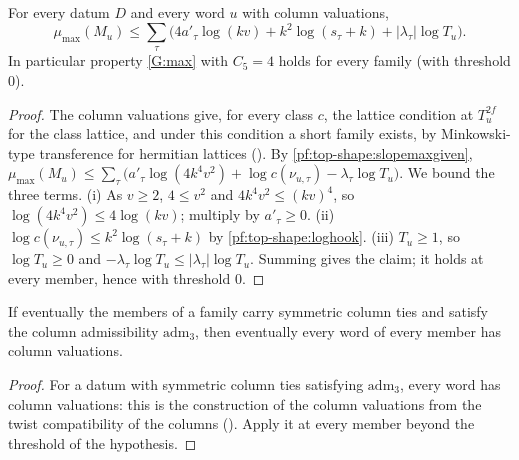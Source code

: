 \begin{theorem}\label{pf:top-shape:upslope}
For every datum $D$ and every word $u$ with column valuations,
\[
\mu_{\max}(M_u)\le\sum_\tau\bigl(4a'_\tau\log(kv)+k^2\log(s_\tau+k)+|\lambda_\tau|\log T_u\bigr).
\]
In particular property \ref{G:max} with $C_5=4$ holds for every family (with threshold $0$).
\end{theorem}

\begin{proof}
The column valuations give, for every class $c$, the lattice condition at $T_u^{2f}$ for the class lattice, and under
this condition a short family exists, by Minkowski-type transference for hermitian lattices
(). By \cref{pf:top-shape:slopemaxgiven},
$\mu_{\max}(M_u)\le\sum_\tau\bigl(a'_\tau\log(4k^4v^2)+\log c(\nu_{u,\tau})-\lambda_\tau\log T_u\bigr)$. We bound the three
terms. (i) As $v\ge2$, $4\le v^2$ and $4k^4v^2\le(kv)^4$, so $\log(4k^4v^2)\le4\log(kv)$; multiply by $a'_\tau\ge0$.
(ii) $\log c(\nu_{u,\tau})\le k^2\log(s_\tau+k)$ by \cref{pf:top-shape:loghook}. (iii) $T_u\ge1$, so $\log T_u\ge0$ and
$-\lambda_\tau\log T_u\le|\lambda_\tau|\log T_u$. Summing gives the claim; it holds at every member, hence with threshold
$0$.
\end{proof}

\begin{lemma}\label{pf:top-shape:tcv}
If eventually the members of a family carry symmetric column ties and satisfy the column admissibility
$\mathrm{adm}_3$, then eventually every word of every member has column valuations.
\end{lemma}

\begin{proof}
For a datum with symmetric column ties satisfying $\mathrm{adm}_3$, every word has column valuations: this is the
construction of the column valuations from the twist compatibility of the columns
(). Apply it at every member beyond the
threshold of the hypothesis.
\end{proof}

